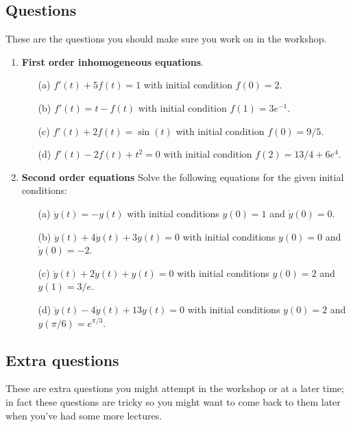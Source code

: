 \documentclass[11pt,a4paper]{scrartcl}
\begin{document}
\subsection*{Questions}

These are the questions you should make sure you work on in the workshop.

\begin{enumerate}

\item \textbf{First order inhomogeneous equations}.
	\begin{itemize}
		\item[(a)] $f'(t) + 5f(t) = 1$ with initial condition $f(0) = 2$.
		\item[(b)] $f'(t) = t - f(t)$ with initial condition $f(1) = 3e^{-1}$.
		\item[(c)] $f'(t) +2f(t) = \sin(t)$ with initial condition $f(0) = 9/5$.
		\item[(d)] $f'(t) - 2f(t) + t^2 = 0$ with initial condition $f(2) = 13/4 + 6e^4$.
	\end{itemize}


\item \textbf{Second order equations} Solve the following equations for the given initial conditions:
	\begin{itemize}
		\item[(a)] $\ddot{y}(t) = -y(t)$ with initial conditions $y(0) = 1$ and $\dot{y}(0) = 0$.
		\item[(b)] $\ddot{y}(t) + 4\dot{y}(t) + 3y(t) = 0$ with initial conditions $y(0) = 0$ and $\dot{y}(0) = -2$.
		\item[(c)] $\ddot{y}(t) + 2\dot{y}(t) + y(t) = 0$ with initial conditions $y(0) = 2$ and $y(1) = 3/e$.
		\item[(d)] $\ddot{y}(t) - 4\dot{y}(t) + 13y(t) = 0$ with initial conditions $y(0) = 2$ and $y(\pi/6) = e^{\pi/3}$.
	\end{itemize}
	

        

\end{enumerate}
        
\subsection*{Extra questions}

These are extra questions you might attempt in the workshop or at a
later time; in fact these questions are tricky so you might want to
come back to them later when you've had some more lectures.
\end{document}
